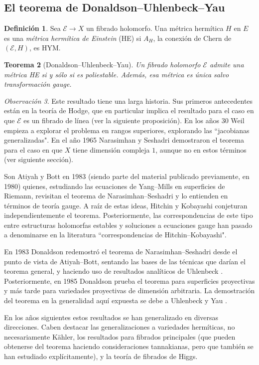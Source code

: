 \documentclass[12pt, a4paper]{amsart}
\newcommand\EE{\mathscr{E}}
\newtheorem{thm}{Teorema}[section]
\theoremstyle{remark} \newtheorem{rmk}[thm]{Observación}
\theoremstyle{remark} \newtheorem{rmks}[thm]{Observaciones}
\theoremstyle{definition} \newtheorem{defn}[thm]{Definición}
\theoremstyle{definition} \newtheorem{ejs}[thm]{Ejemplos}
\theoremstyle{definition} \newtheorem{ej}[thm]{Ejemplo}
\begin{document}
\subsection{El teorema de Donaldson--Uhlenbeck--Yau}

\begin{defn}
	Sea $\EE\rightarrow X$ un fibrado holomorfo. Una métrica hermítica  $H$ en $E$ es una \emph{métrica hermítica de Einstein} (HE) si $A_H$, la conexión de Chern de $(\EE,H)$, es HYM.
\end{defn}

\begin{thm}[Donaldson--Uhlenbeck--Yau]
	Un fibrado holomorfo $\EE$ admite una métrica HE si y sólo si es poliestable. Además, esa métrica es única salvo transformación gauge.	
\end{thm}

\begin{rmk}
	Este resultado tiene una larga historia. Sus primeros antecedentes están en la teoría de Hodge, que en particular implica el resultado para el caso en que $\EE$ es un fibrado de línea (ver la siguiente proposición). En los años 30 Weil \cite{GrothenWeil} empieza a explorar el problema en rangos superiores, explorando las ``jacobianas generalizadas". En el año 1965 Narasimhan y Seshadri \cite{NS} demostraron el teorema para el caso en que $X$ tiene dimensión compleja $1$, aunque no en estos términos (ver siguiente sección).

	Son Atiyah y Bott en 1983 \cite{AB} (siendo parte del material publicado previamente, en 1980) quienes, estudiando las ecuaciones de Yang--Mills en superficies de Riemann, revisitan el teorema de Narasimhan--Seshadri y lo entienden en términos de teoría gauge. A raíz de estas ideas, Hitchin y Kobayashi conjeturan independientemente el teorema. Posteriormente, las correspondencias de este tipo entre estructuras holomorfas estables y soluciones a ecuaciones gauge han pasado a denominarse en la literatura ``correspondencias de Hitchin--Kobayashi". 

	En 1983 Donaldson \cite{DNS} redemostró el teorema de Narasimhan--Seshadri desde el punto de vista de Atiyah--Bott, sentando las bases de las técnicas que darían el teorema general, y haciendo uso de resultados analíticos de Uhlenbeck \cite{Uhlenbeck}. Posteriormente, en 1985 Donaldson \cite{DASD} prueba el teorema para superficies proyectivas y más tarde para variedades proyectivas de dimensión arbitraria. La demostración del teorema en la generalidad aquí expuesta se debe a Uhlenbeck y Yau \cite{UY}. 

	En los años siguientes estos resultados se han generalizado en diversas direcciones. Caben destacar las generalizaciones a variedades hermíticas, no necesariamente Kähler, los resultados para fibrados principales (que pueden obtenerse del teorema haciendo consideraciones tannakianas, pero que también se han estudiado explícitamente), y la teoría de fibrados de Higgs.
\end{rmk}
\end{document}
